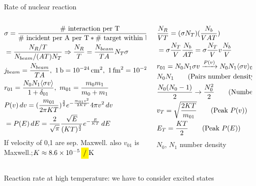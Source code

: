 \begin{frame}{Rate of nuclear reaction}
    \begin{columns}[T]
        \begin{column}{0.5\textwidth}
            \begin{align*}
                &\sigma=\frac{\#\text{ interaction per T}}{\# \text{ incident per A per T}*\#\text{ target within beam}}\\
                &=\frac{N_R/T}{N_{beam}/(AT)N_T}\Rightarrow \frac{N_R}{T}=\frac{N_{beam}}{TA}N_T\sigma\\
                &j_{beam}=\frac{N_{beam}}{TA},\ \SI{1}{\barn}=\SI{e-24}{\square\cm},\ \SI{1}{\square\femto\meter}=\SI{e-2}{\barn}\\
                &r_{01}=\frac{N_0N_1\exv{\sigma v}}{1+\delta_{01}},\ m_{01}=\frac{m_0m_1}{m_0+m_1}\\
                &P(v)\,dv=(\frac{m_{01}}{2\pi KT})^{\frac{3}{2}}\exp{-\frac{m_{01}v^2}{2KT}}4\pi v^2\,dv\\
                &=P(E)\,dE=\frac{2}{\sqrt{\pi}}\frac{\sqrt{E}}{(KT)^{\frac{3}{2}}}\exp{-\frac{E}{KT}}\,dE
            \end{align*}
            If velocity of 0,1 are sep. Maxwell. also $v_{01}$ is Maxwell.;$K\approx\SI{8.6e-5}{\ev\per\kelvin}$
        \end{column}
        \begin{column}{0.5\textwidth}
            \begin{align*}
                &\frac{N_R}{VT}=(\sigma N_T)(\frac{N_b}{VAT})\\
                &=\sigma \frac{N_T}{V}\frac{N_b}{AT}=\sigma \frac{N_T}{V}v \frac{N_b}{V}\\
                &r_{01}=N_0N_1\sigma v\xrightarrow{P(v)}N_0N_1\langle \sigma v \rangle_{01}\\
                &N_0N_1\tag{Pairs number density: non id.}\\
                &\frac{N_0(N_0-1)}{2}\to \frac{N_0^2}{2}\tag{Number density pairs: id}\\
                &v_T=\sqrt{\frac{2KT}{m_{01}}}\tag{Peak $P(v)$}\\
                &E_T=\frac{KT}{2}\tag{Peak $P(E)$}
            \end{align*}
            $N_0$, $N_1$ number density
        \end{column}
    \end{columns}
    \begin{block}{Reaction rate at high temperature: we have to consider excited states}

\end{block}
\end{frame}
